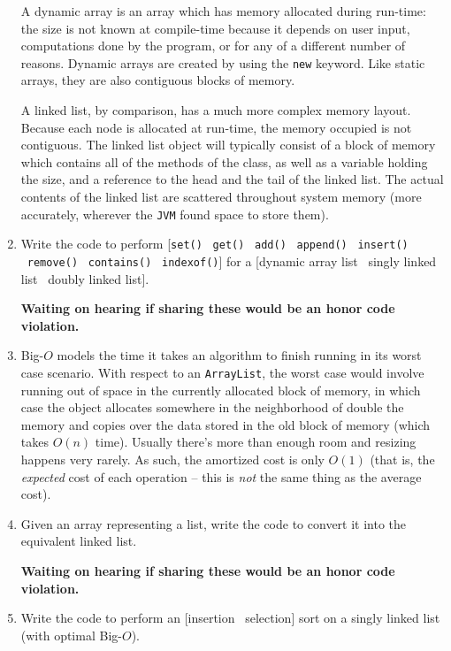 \documentclass[10pt]{article}
\begin{document}
\begin{enumerate}[leftmargin=0em]
    A dynamic array is an array which has memory allocated during run-time: the size is not known at compile-time because it depends on user input, computations done by the program, or for any of a different number of reasons. Dynamic arrays are created by using the \texttt{new} keyword. Like static arrays, they are also contiguous blocks of memory.

    A linked list, by comparison, has a much more complex memory layout. Because each node is allocated at run-time, the memory occupied is not contiguous. The linked list object will typically consist of a block of memory which contains all of the methods of the class, as well as a variable holding the size, and a reference to the head and the tail of the linked list. The actual contents of the linked list are scattered throughout system memory (more accurately, wherever the \texttt{JVM} found space to store them).
    \item Write the code to perform [\texttt{set()} \vline\ \texttt{get()} \vline\ \texttt{add()} \vline\ \texttt{append()} \vline\ \texttt{insert()} \vline\ \texttt{remove()} \vline\ \texttt{contains()} \vline\ \texttt{indexof()}] for a [dynamic array list \vline\ singly linked list \vline\ doubly linked list].
    
    \textbf{Waiting on hearing if sharing these would be an honor code violation.}
    \item Big-$O$ models the time it takes an algorithm to finish running in its worst case scenario. With respect to an \texttt{ArrayList}, the worst case would involve running out of space in the currently allocated block of memory, in which case the object allocates somewhere in the neighborhood of double the memory and copies over the data stored in the old block of memory (which takes $O(n)$ time). Usually there's more than enough room and resizing happens very rarely. As such, the amortized cost is only $O(1)$ (that is, the \textit{expected} cost of each operation -- this is \textit{not} the same thing as the average cost).

    \item Given an array representing a list, write the code to convert it into the equivalent linked list.
    
    \textbf{Waiting on hearing if sharing these would be an honor code violation.}
    \item Write the code to perform an [insertion \vline\ selection] sort on a singly linked list (with optimal Big-$O$).
    

\end{enumerate}
\end{document}
